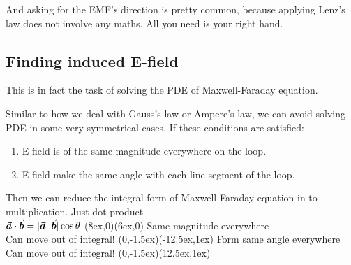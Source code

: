 \documentclass[class=article, crop=false, 12pt]{standalone}
\begin{document}
And asking for the EMF's direction is pretty common,
because applying Lenz's law does not involve any maths.
All you need is your right hand.

\subsection{Finding induced E-field}

This is in fact the task of solving the PDE of Maxwell-Faraday equation.

Similar to how we deal with Gauss's law or Ampere's law,
we can avoid solving PDE in some very symmetrical cases.
If these conditions are satisfied:
\begin{enumerate}
    \item E-field is of the same magnitude everywhere on the loop.
    \item E-field make the same angle with each line segment of the loop.
\end{enumerate}

Then we can reduce the integral form of Maxwell-Faraday equation in to multiplication.
{\scriptsize Just dot product\\[-1ex]\scriptsize $\va*{a}\cdot\va*{b}=|\va*{a}||\va*{b}|\cos\theta$}
{(8ex,0)}{(6ex,0)}
{Same magnitude everywhere\\[-0.5ex]Can move out of integral!}
{(0,-1.5ex)}{(-12.5ex,1ex)}
{Form same angle everywhere\\[-0.5ex]Can move out of integral!}
{(0,-1.5ex)}{(12.5ex,1ex)}
\end{document}
